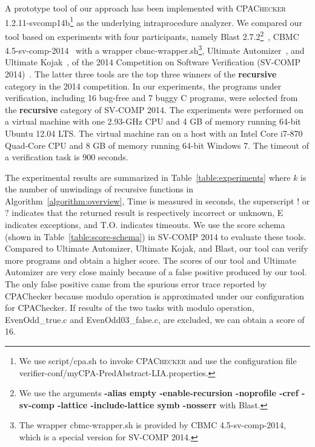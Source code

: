 \newcommand{\safe}{S}
\newcommand{\unsafe}{U}
\newcommand{\unknown}{?}
\newcommand{\exception}{E}
\newcommand{\timeout}{T.O.}
\newcommand{\unknownmark}{\ensuremath{^?}}
\newcommand{\wrongmark}{\ensuremath{^!}}

A prototype tool of our approach has been implemented with
\textsc{CPAChecker} 1.2.11-svcomp14b\footnote{We use script/cpa.sh to
  invoke \textsc{CPAChecker} and use the configuration file
  verifier-conf/myCPA-PredAbstract-LIA.properties.} as the underlying
intraprocedure analyzer.
We compared our tool based on experiments with four participants,
namely Blast 2.7.2\footnote{We use the arguments \textbf{-alias empty
    -enable-recursion -noprofile -cref -sv-comp -lattice
    -include-lattice symb -nosserr} with Blast.}~\cite{BeyerHJM07},
CBMC 4.5-sv-comp-2014~\cite{ClarkeKL04} with a wrapper
cbmc-wrapper.sh\footnote{The wrapper cbmc-wrapper.sh is provided by
  CBMC 4.5-sv-comp-2014, which is a special version for SV-COMP
  2014.}, Ultimate Automizer~\cite{HeizmannCDEHLNSP13}, and Ultimate
Kojak~\cite{Kojak}, of the 2014 Competition on Software Verification
(SV-COMP 2014)~\cite{svcomp14}.
The latter three tools are the top three winners of the
\textbf{recursive} category in the 2014 competition.
In our experiments, the programs under verification, including 16
bug-free and 7 buggy C programs, were selected from the
\textbf{recursive} category of SV-COMP 2014.
The experiments were performed on a virtual machine with one 2.93-GHz 
CPU and 4 GB of memory running 64-bit Ubuntu 12.04 LTS.
The virtual machine ran on a host with an Intel Core i7-870 Quad-Core
CPU and 8 GB of memory running 64-bit Windows 7.
The timeout of a verification task is 900 seconds.

The experimental results are summarized in
Table~\ref{table:experiments} where $k$ is the number of unwindings of
recursive functions in Algorithm~\ref{algorithm:overview}, Time is
measured in seconds, the superscript $!$ or $?$ indicates that the
returned result is respectively incorrect or unknown, E indicates
exceptions, and T.O. indicates timeouts.
We use the score schema (shown in Table~\ref{table:score-schema}) in
SV-COMP 2014 to evaluate these tools.
Compared to Ultimate Automizer, Ultimate Kojak, and Blast, our tool
can verify more programs and obtain a higher score.
The scores of our tool and Ultimate Automizer are very close mainly
because of a false positive produced by our tool.
The only false positive came from the spurious error trace reported
by CPAChecker because modulo operation is approximated under our 
configuration for CPAChecker. If results of the two tasks with modulo
operation, EvenOdd\_true.c and EvenOdd03\_false.c, are excluded, we
can obtain a score of 16.

